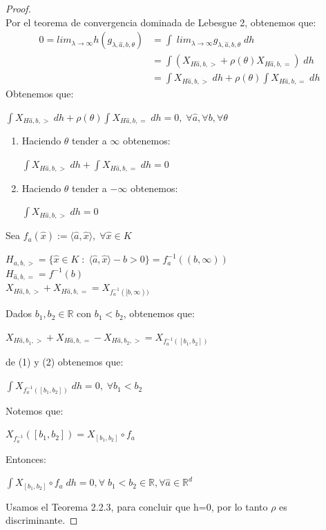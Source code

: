 \documentclass[12pt,a4paper]{book}
\providecommand{\inp}[1]{\langle#1\rangle}
\providecommand{\conj}[1]{\lbrace#1\rbrace}
\begin{document}
\begin{proof}
\\
Por el teorema de convergencia dominada de Lebesgue 2, obtenemos que:
\begin{equation*}
\begin{split}
0=lim_{\lambda\rightarrow\infty}h(g_{\lambda,\widehat{a},b,\theta})&=\int\;lim_{\lambda\rightarrow\infty}g_{\lambda,\widehat{a},b,\theta}\;dh\\
&=\int (X_{H\widehat{a},b,>}+\rho(\theta)X_{H\widehat{a},b,=})\;dh\\
&=\int X_{H\widehat{a},b,>}\;dh+\rho(\theta)\int X_{H\widehat{a},b,=}\;dh
\end{split}
\end{equation*}
Obtenemos que:
\begin{center}
$\int X_{H\widehat{a},b,>}\;dh+\rho(\theta)\int X_{H\widehat{a},b,=}\;dh=0,\;\forall\widehat{a},\forall b,\forall \theta$
\end{center}
\begin{enumerate}
\item Haciendo $\theta$ tender a $\infty$ obtenemos:
\begin{center}
$\int X_{H\widehat{a},b,>}\;dh+\int X_{H\widehat{a},b,=}\;dh=0$
\end{center}
\item Haciendo $\theta$ tender a $-\infty$ obtenemos:
\begin{center}
$\int X_{H\widehat{a},b,>}\;dh=0$
\end{center}
\end{enumerate}
Sea $f_{a}(\widehat{x}):=\inp{\widehat{a},\widehat{x}},\;\forall\widehat{x}\in K$
\begin{center}
$H_{a,b,>}=\conj{\widehat{x}\in K\;:\;\inp{\widehat{a},\widehat{x}}-b>0}=f^{-1}_{a}((b,\infty))$\\
$H_{\widehat{a},b,=}=f^{-1}({b})$\\
$X_{H\widehat{a},b,>}+X_{H\widehat{a},b,=}=X_{f^{-1}_{a}([b,\infty))}$
\end{center}
Dados $b_{1},b_{2}\in\mathbb{R}$ con $b_{1}<b_{2}$, obtenemos que:
\begin{center}
$X_{H\widehat{a},b_{1},>}+X_{H\widehat{a},b,=}-X_{H\widehat{a},b_{2},>}=X_{f^{-1}_{a}([b_{1},b_{2}])}$
\end{center}
de (1) y (2) obtenemos que:
\begin{center}
$\int X_{f_{a}^{-1}([b_{1},b_{2}])}\;dh=0,\;\forall b_{1}<b_{2}$
\end{center}
Notemos que:
\begin{center}
$X_{f_{a}^{-1}}([b_{1},b_{2}])=X_{[b_{1},b_{2}]}\circ f_{a}$
\end{center}
Entonces:
\begin{center}
$\int X_{[b_{1},b_{2}]}\circ f_{a}\;dh=0,\forall\; b_{1}<b_{2}\in\mathbb{R},\forall \widehat{a}\in\mathbb{R}^{d}$
\end{center}
Usamos el Teorema 2.2.3, para concluir que h=0, por lo tanto $\rho$ es discriminante.
\end{proof}
\end{document}
